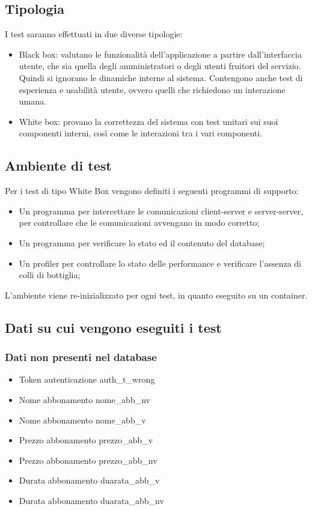 \subsection*{Tipologia}
I test saranno effettuati in due diverse tipologie:
\begin{itemize}
    \item Black box: valutano le funzionalità dell'applicazione a partire dall'interfaccia utente, che
    sia quella degli amministratori o degli utenti fruitori del servizio. Quindi si ignorano le dinamiche
    interne al sistema. Contengono anche test di esperienza e usabilità utente, ovvero quelli che richiedono
    un interazione umana.
    \item White box: provano la correttezza del sistema con test unitari sui suoi componenti interni, 
    così come le interazioni tra i vari componenti.
\end{itemize}

\subsection*{Ambiente di test}
Per i test di tipo White Box vengono definiti i seguenti programmi di supporto:
\begin{itemize}
    \item Un programma per intercettare le comunicazioni client-server e server-server, per controllare che le
    comunicazioni avvengano in modo corretto;
    \item Un programma per verificare lo stato ed il contenuto del database;
    \item Un profiler per controllare lo stato delle performance e verificare l’assenza di colli di bottiglia;
\end{itemize}
L’ambiente viene re-inizializzato per ogni test, in quanto eseguito su un container.

\subsection*{Dati su cui vengono eseguiti i test}

\subsubsection*{Dati non presenti nel database}
\begin{itemize}
    \item Token autenticazione auth\_t\_wrong
    \item Nome abbonamento nome\_abb\_nv
    \item Nome abbonamento nome\_abb\_v
    \item Prezzo abbonamento prezzo\_abb\_v
    \item Prezzo abbonamento prezzo\_abb\_nv
    \item Durata abbonamento duarata\_abb\_v
    \item Durata abbonamento duarata\_abb\_nv

\end{itemize}

